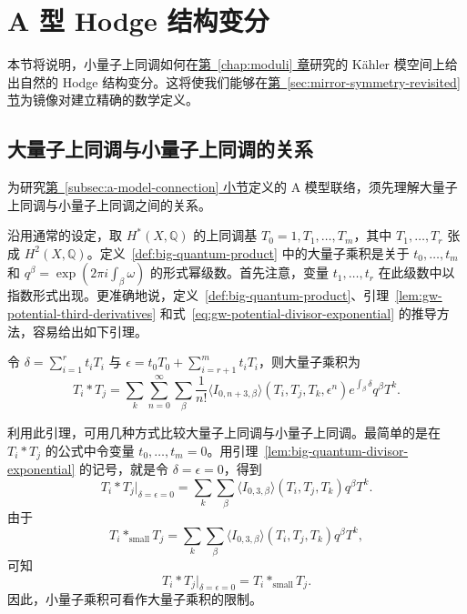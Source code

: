 \section{A 型 Hodge 结构变分}\label{sec:a-model-vhs}
本节将说明，小量子上同调如何在\hyperref[chap:moduli]{第~\ref*{chap:moduli} 章}研究的 Kähler 模空间上给出自然的 Hodge 结构变分。这将使我们能够在\hyperref[sec:mirror-symmetry-revisited]{第~\ref*{sec:mirror-symmetry-revisited} 节}为镜像对建立精确的数学定义。
\subsection{大量子上同调与小量子上同调的关系}\label{subsec:quantum-product-dependence}
为研究\hyperref[subsec:a-model-connection]{第~\ref*{subsec:a-model-connection} 小节}定义的 A 模型联络，须先理解大量子上同调与小量子上同调之间的关系。

沿用通常的设定，取 $H^*(X,\mathbb Q)$ 的上同调基 $T_0=1,T_1,\ldots,T_m$，其中 $T_1,\ldots,T_r$ 张成 $H^2(X,\mathbb Q)$。定义~\ref{def:big-quantum-product} 中的大量子乘积是关于 $t_0,\ldots,t_m$ 和 $q^\beta=\exp(2\pi i\int_\beta\omega)$ 的形式幂级数。首先注意，变量 $t_1,\ldots,t_r$ 在此级数中以指数形式出现。更准确地说，定义~\ref{def:big-quantum-product}、引理~\ref{lem:gw-potential-third-derivatives} 和式~\eqref{eq:gw-potential-divisor-exponential} 的推导方法，容易给出如下引理。
\begin{lemma}\label{lem:big-quantum-divisor-exponential}
令 $\delta=\sum_{i=1}^rt_iT_i$ 与 $\epsilon=t_0T_0+\sum_{i=r+1}^mt_iT_i$，则大量子乘积为
\[
T_i*T_j=\sum_k\sum_{n=0}^{\infty}\sum_\beta\frac1{n!}
\langle I_{0,n+3,\beta}\rangle(T_i,T_j,T_k,\epsilon^n)
 e^{\int_\beta\delta}q^\beta T^k.
\]
\end{lemma}
利用此引理，可用几种方式比较大量子上同调与小量子上同调。最简单的是在 $T_i*T_j$ 的公式中令变量 $t_0,\ldots,t_m=0$。用引理~\ref{lem:big-quantum-divisor-exponential} 的记号，就是令 $\delta=\epsilon=0$，得到
\[
T_i*T_j\big|_{\delta=\epsilon=0}
=\sum_k\sum_\beta\langle I_{0,3,\beta}\rangle(T_i,T_j,T_k)q^\beta T^k.
\]
由于
\begin{equation}\label{eq:small-quantum-product-comparison}
T_i*_{\mathrm{small}}T_j=\sum_k\sum_\beta
\langle I_{0,3,\beta}\rangle(T_i,T_j,T_k)q^\beta T^k,
\end{equation}
可知
\[
T_i*T_j\big|_{\delta=\epsilon=0}=T_i*_{\mathrm{small}}T_j.
\]
因此，小量子乘积可看作大量子乘积的限制。

